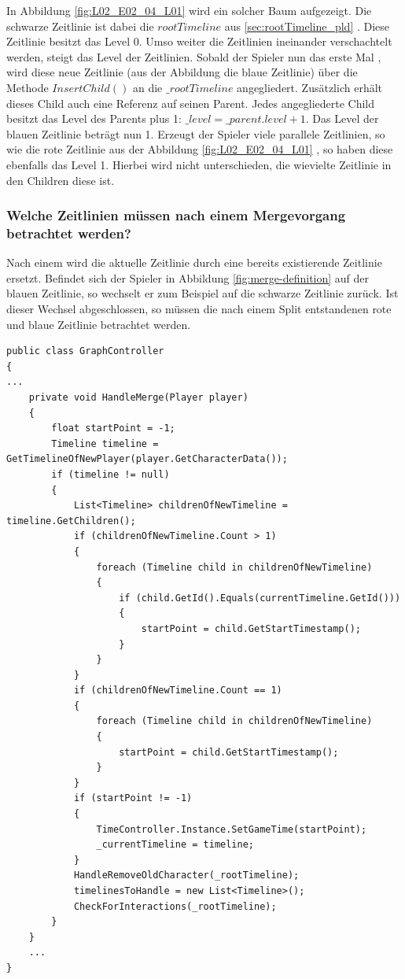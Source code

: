 In Abbildung \ref{fig:L02_E02_04_L01}  wird ein solcher Baum aufgezeigt. Die schwarze Zeitlinie ist dabei die $rootTimeline$ aus \ref{sec:rootTimeline_pld} . Diese Zeitlinie besitzt das Level 0. Umso weiter die Zeitlinien ineinander verschachtelt werden, steigt das Level der Zeitlinien. Sobald der Spieler nun das erste Mal , wird diese neue Zeitlinie (aus der Abbildung die blaue Zeitlinie) über die Methode $InsertChild()$ an die $\_rootTimeline$ angegliedert. Zusätzlich erhält dieses Child auch eine Referenz auf seinen Parent. Jedes angegliederte Child besitzt das Level des Parents plus 1: $\_level = \_parent.level +1$. Das Level der blauen Zeitlinie beträgt nun 1. Erzeugt der Spieler viele parallele  Zeitlinien, so wie die rote Zeitlinie aus der Abbildung \ref{fig:L02_E02_04_L01} , so haben diese ebenfalls das Level 1. Hierbei wird nicht unterschieden, die wievielte Zeitlinie in den Children diese ist. 

\subsubsection{Welche Zeitlinien müssen nach einem Mergevorgang betrachtet werden?}\label{sec:good_02}
Nach einem  wird die aktuelle Zeitlinie durch eine bereits existierende Zeitlinie ersetzt. Befindet sich der Spieler in Abbildung \ref{fig:merge-definition} auf der blauen Zeitlinie, so wechselt er zum Beispiel auf die schwarze Zeitlinie zurück. Ist dieser Wechsel abgeschlossen, so müssen die nach einem Split entstandenen rote und blaue Zeitlinie betrachtet werden.

\begin{lstlisting}[caption={HandleMerge Methode aus dem alten Prototyp}, label={sec:old_merge}]
public class GraphController
{
...
    private void HandleMerge(Player player)
    {
        float startPoint = -1;
        Timeline timeline = GetTimelineOfNewPlayer(player.GetCharacterData());
        if (timeline != null)
        {
            List<Timeline> childrenOfNewTimeline = timeline.GetChildren();
            if (childrenOfNewTimeline.Count > 1)
            {
                foreach (Timeline child in childrenOfNewTimeline)
                {
                    if (child.GetId().Equals(currentTimeline.GetId()))
                    {
                        startPoint = child.GetStartTimestamp();
                    }
                }
            }
            if (childrenOfNewTimeline.Count == 1)
            {
                foreach (Timeline child in childrenOfNewTimeline)
                {
                    startPoint = child.GetStartTimestamp();
                }
            }
            if (startPoint != -1)
            {
                TimeController.Instance.SetGameTime(startPoint);
                _currentTimeline = timeline;
            }
            HandleRemoveOldCharacter(_rootTimeline);
            timelinesToHandle = new List<Timeline>();
            CheckForInteractions(_rootTimeline);
        }
    }
    ...
}
\end{lstlisting}



